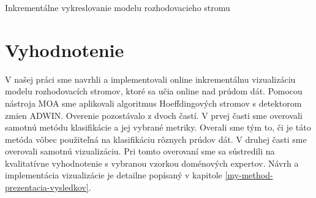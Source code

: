 \begin{algorithm}[H]
	\label{alg:visualization}
	\SetAlgoLined
    

  \caption{Inkrementálne vykreslovanie modelu rozhodovacieho stromu}
\end{algorithm}


\chapter{Vyhodnotenie}
V našej práci sme navrhli a implementovali online inkrementálnu vizualizáciu modelu rozhodovacích stromov, ktoré sa učia online nad prúdom dát. Pomocou nástroja MOA sme aplikovali algoritmus Hoeffdingových stromov s detektorom zmien ADWIN. Overenie pozostávalo z dvoch častí. V prvej časti sme overovali samotnú metódu klasifikácie a jej vybrané metriky. Overali sme tým to, či je táto metóda vôbec použiteľná na klasifikáciu rôznych prúdov dát. V druhej časti sme overovali samotnú vizualizáciu. Pri tomto overovaní sme sa sústredili na kvalitatívne vyhodnotenie s vybranou vzorkou doménových expertov. Návrh a implementácia vizualizácie je detailne popísaný v kapitole \ref{my-method-prezentacia-vysledkov}.

